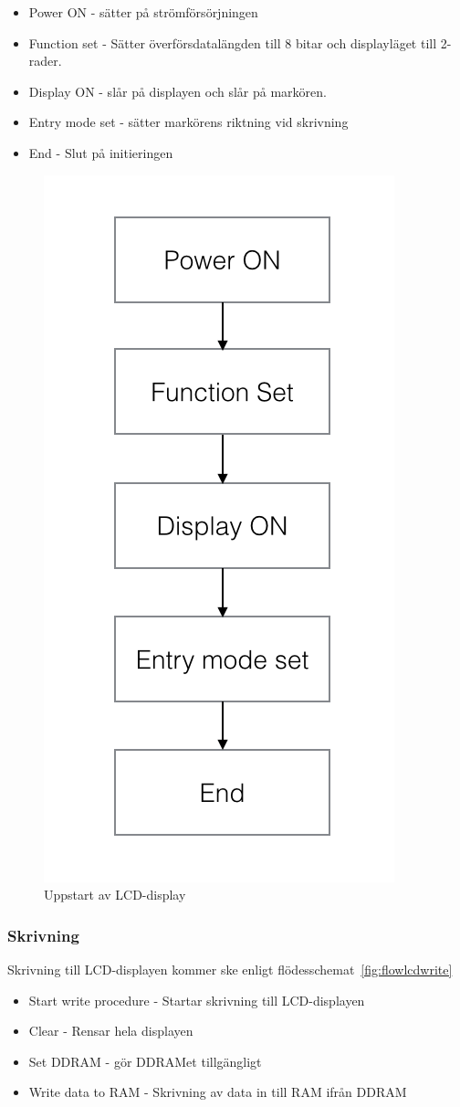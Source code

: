 \documentclass[a4paper,12pt,fleqn]{article}
\begin{document}
\begin{itemize}
  \item Power ON - sätter på strömförsörjningen
  \item Function set - Sätter överförsdatalängden till 8 bitar och displayläget till 2-rader.
  \item Display ON - slår på displayen och slår på markören. 
  \item Entry mode set - sätter markörens riktning vid skrivning
  \item End - Slut på initieringen
\end{itemize}

\begin{figure}[htp]
	  \begin{center}
	  \includegraphics[keepaspectratio=true,width=0.4\linewidth]{bilder/startup}  %
	  \end{center}
	  \caption{Uppstart av LCD-display} %
	  \label{fig:flowlcdstart}
	\end{figure}

\newpage


\subsubsection{Skrivning}

Skrivning till LCD-displayen kommer ske enligt flödesschemat~\ref{fig:flowlcdwrite}
\begin{itemize}
  \item Start write procedure - Startar skrivning till LCD-displayen
  \item Clear - Rensar hela displayen
  \item Set DDRAM - gör DDRAMet tillgängligt
  \item Write data to RAM - Skrivning av data in till RAM ifrån DDRAM
\end{itemize}
\end{document}
